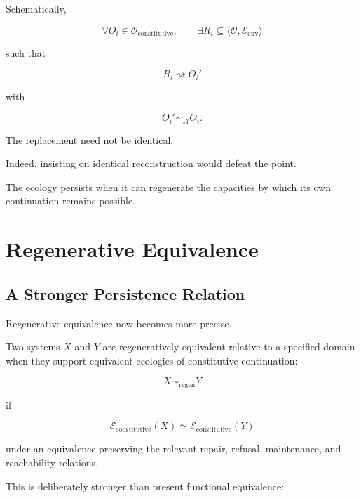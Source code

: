\documentclass[11pt]{article}
\theoremstyle{remark}
\newcommand{\Adm}{\mathcal{A}}
\begin{document}
Schematically,

\begin{equation}
\forall O_i\in\mathcal{O}_{\mathrm{constitutive}},
\qquad
\exists
R_i\subseteq\langle\mathcal{O},\mathcal{E}_{\mathrm{env}}\rangle
\end{equation}

such that

\begin{equation}
R_i
\rightsquigarrow
O_i'
\end{equation}

with

\begin{equation}
O_i'
\sim_{\Adm}
O_i.
\end{equation}

The replacement need not be identical.

Indeed, insisting on identical reconstruction would defeat the point.

The ecology persists when it can regenerate the capacities by which its own continuation remains possible.

\section{Regenerative Equivalence}

\subsection{A Stronger Persistence Relation}

Regenerative equivalence now becomes more precise.

Two systems $X$ and $Y$ are regeneratively equivalent relative to a specified domain when they support equivalent ecologies of constitutive continuation:

\begin{equation}
X\sim_{\mathrm{regen}}Y
\end{equation}

if

\begin{equation}
\mathcal{E}_{\mathrm{constitutive}}(X)
\simeq
\mathcal{E}_{\mathrm{constitutive}}(Y)
\end{equation}

under an equivalence preserving the relevant repair, refusal, maintenance, and reachability relations.

This is deliberately stronger than present functional equivalence:
\end{document}
